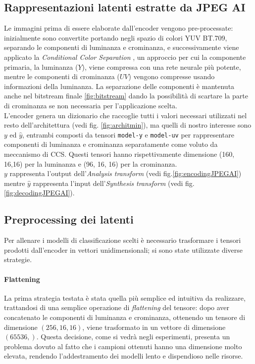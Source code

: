 \subsection{Rappresentazioni latenti estratte da JPEG AI}\label{subsec:latenti}
Le immagini prima di essere elaborate dall'encoder vengono pre-processate: inizialmente sono convertite portando negli spazio di colori YUV BT.709, separando le componenti di luminanza e crominanza, e successivamente viene applicato la \textit{Conditional Color Separation} \cite{10018070}, un approccio per cui la componente primaria, la luminanza ($Y$), viene compressa con una rete neurale più potente, mentre le componenti di crominanza ($UV$) vengono compresse usando informazioni della luminanza.
La separazione delle componenti è mantenuta anche nel bitstream finale \ref{fig:bitstream} dando la possibilità di scartare la parte di crominanza se non necessaria per l'applicazione scelta.\\
L'encoder genera un dizionario che raccoglie tutti i valori necessari utilizzati nel resto dell'architettura (vedi fig. \ref{fig:architmin}), ma quelli di nostro interesse sono $y$ ed $\hat{y}$, entrambi composti da tensori \texttt{model-y} e \texttt{model-uv} per rappresentare componenti di luminanza e crominanza separatamente come voluto da meccanismo di CCS. Questi tensori hanno rispettivamente dimensione (160, 16,16) per la luminanza e (96, 16, 16) per la crominanza.\\
$y$ rappresenta l'output dell'\textit{Analysis transform} (vedi fig.\ref{fig:encodingJPEGAI}) mentre $\hat{y}$ rappresenta l'input dell'\textit{Synthesis transform} (vedi fig. \ref{fig:decodingJPEGAI}).
\subsection{Preprocessing dei latenti}\label{sec:preprocessing}
Per allenare i modelli di classificazione scelti è necessario trasformare i tensori prodotti dall'encoder in vettori unidimensionali; si sono state utilizzate diverse strategie.
\paragraph{Flattening} La prima strategia testata è stata quella più semplice ed intuitiva da realizzare, trattandosi di una semplice operazione di \textit{flattening} del tensore: dopo aver concatenato le componenti di luminanza e crominanza, ottenendo un tensore di dimensione $(256, 16, 16)$, viene trasformato in un vettore di dimensione $(65536, )$. Questa decisione, come si vedrà negli esperimenti, presenta un problema dovuto al fatto che i campioni ottenuti hanno una dimensione molto elevata, rendendo l'addestramento dei modelli lento e dispendioso nelle risorse.
